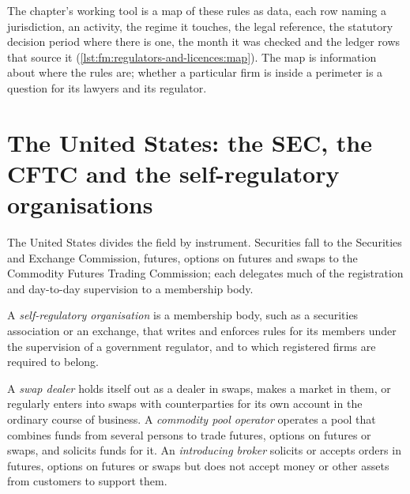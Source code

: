 The chapter's working tool is a map of these rules as data, each row naming a jurisdiction, an activity, the regime it touches, the legal
reference, the statutory decision period where there is one, the month it was checked and the ledger rows that source it
(\cref{lst:fm:regulators-and-licences:map}). The map is information about where the rules are; whether a particular firm is inside a perimeter is a
question for its lawyers and its regulator.

\label{lst:fm:regulators-and-licences:map}

\section{The United States: the SEC, the CFTC and the self-regulatory organisations}

The United States divides the field by instrument. Securities fall to the Securities and Exchange Commission, futures, options on futures and swaps
to the Commodity Futures Trading Commission; each delegates much of the registration and day-to-day supervision to a membership body.

\begin{definition}\label{def:fm:regulators-and-licences:sro}
A \emph{self-regulatory organisation} is a membership body, such as a securities association or an exchange,
that writes and enforces rules for its members under the supervision of a government regulator, and to which registered firms are required to
belong.
\end{definition}

\begin{definition}\label{def:fm:regulators-and-licences:cftc}
A \emph{swap dealer} holds itself out as a dealer in swaps, makes a market in them, or regularly enters into swaps with
counterparties for its own account in the ordinary course of business. A \emph{commodity pool operator} operates a
pool that combines funds from several persons to trade futures, options on futures or swaps, and solicits funds for it. An \emph{introducing
broker} solicits or accepts orders in futures, options on futures or swaps but does not accept money or other assets
from customers to support them.
\end{definition}

